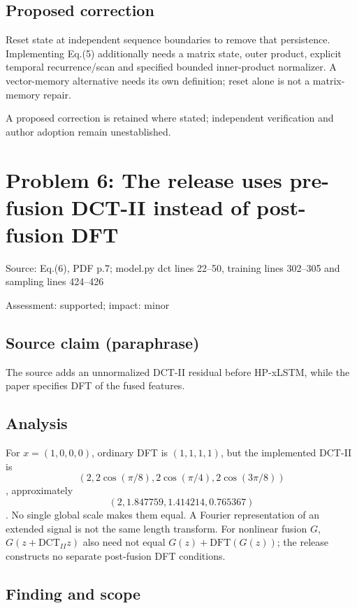 \documentclass[11pt]{article}
\begin{document}
\subsection*{Proposed correction}

Reset state at independent sequence boundaries to remove that persistence. Implementing Eq.(5) additionally needs a matrix state, outer product, explicit temporal recurrence/scan and specified bounded inner-product normalizer. A vector-memory alternative needs its own definition; reset alone is not a matrix-memory repair.

A proposed correction is retained where stated; independent verification and author adoption remain unestablished.

\section*{Problem 6: The release uses pre-fusion DCT-II instead of post-fusion DFT}

Source: Eq.(6), PDF p.7; model.py dct lines 22–50, training lines 302–305 and sampling lines 424–426

Assessment: supported; impact: minor

\subsection*{Source claim (paraphrase)}

The source adds an unnormalized DCT-II residual before HP-xLSTM, while the paper specifies DFT of the fused features.

\subsection*{Analysis}

For \(x=(1,0,0,0)\), ordinary DFT is \((1,1,1,1)\), but the implemented DCT-II is \[(2,2\cos(\pi/8),2\cos(\pi/4),2\cos(3\pi/8))\], approximately \[(2,1.847759,1.414214,0.765367)\]. No single global scale makes them equal. A Fourier representation of an extended signal is not the same length transform. For nonlinear fusion \(G\), \(G(z+\mathrm{DCT}_{II}z)\) also need not equal \(G(z)+\mathrm{DFT}(G(z))\); the release constructs no separate post-fusion DFT conditions.

\subsection*{Finding and scope}
\end{document}

